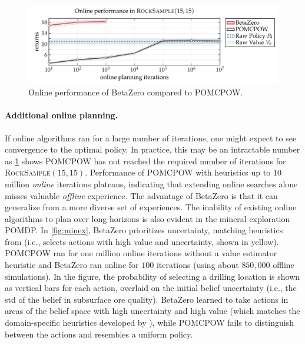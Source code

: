 \begin{figure}[b!]
    \centering
    \includegraphics[trim=0 8 0 9, clip, width=0.95\linewidth]{figures/betazero/results/plot_online_performance.pdf}
    \caption{Online performance of BetaZero compared to POMCPOW.}
    \label{fig:online}
\end{figure}


\paragraph{Additional online planning.}
If online algorithms ran for a large number of iterations, one might expect to see convergence to the optimal policy.
In practice, this may be an intractable number as \cref{fig:online} shows POMCPOW has not reached the required number of iterations for \textsc{RockSample}$(15,15)$.
Performance of POMCPOW with heuristics up to $10$ million \textit{online} iterations plateaus, indicating that extending online searches alone misses valuable \textit{offline} experience.
The advantage of BetaZero is that it can generalize from a more diverse set of experiences.
The inability of existing online algorithms to plan over long horizons is also evident in the mineral exploration POMDP.
In \cref{fig:minex}, BetaZero prioritizes uncertainty, matching heuristics from \textcite{mern2023intelligent} (i.e., selects actions with high value and uncertainty, shown in yellow).
POMCPOW ran for one million online iterations without a value estimator heuristic and BetaZero ran online for $100$ iterations (using about $850{,}000$ offline simulations).
In the figure, the probability of selecting a drilling location is shown as vertical bars for each action, overlaid on the initial belief uncertainty (i.e., the std of the belief in subsurface ore quality).
BetaZero learned to take actions in areas of the belief space with high uncertainty and high value (which matches the domain-specific heuristics developed by \textcite{mern2023intelligent}), while POMCPOW fails to distinguish between the actions and resembles a uniform policy.


